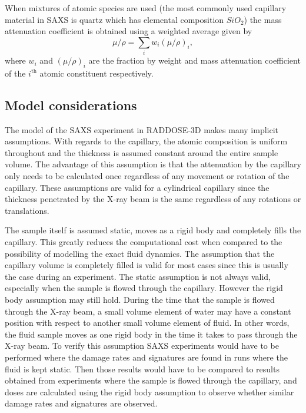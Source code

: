 When mixtures of atomic species are used (the most commonly used capillary material in SAXS is quartz which has elemental composition $SiO_2$) the mass attenuation coefficient is obtained using a weighted average given by
\begin{equation}
    \mu/\rho = \sum_i w_i (\mu/\rho)_i,
\end{equation}
where $w_i$ and $(\mu/\rho)_i$ are the fraction by weight and mass attenuation coefficient of the $i^{\text{th}}$ atomic constituent respectively.

\subsection{Model considerations}
\label{sub:Model considerations}
The model of the SAXS experiment in RADDOSE-3D makes many implicit assumptions.
With regards to the capillary, the atomic composition is uniform throughout and the thickness is assumed constant around the entire sample volume.
The advantage of this assumption is that the attenuation by the capillary only needs to be calculated once regardless of any movement or rotation of the capillary.
These assumptions are valid for a cylindrical capillary since the thickness penetrated by the X-ray beam is the same regardless of any rotations or translations.

The sample itself is assumed static, moves as a rigid body and completely fills the capillary.
This greatly reduces the computational cost when compared to the possibility of modelling the exact fluid dynamics.
The assumption that the capillary volume is completely filled is valid for most cases since this is usually the case during an experiment.
The static assumption is not always valid, especially when the sample is flowed through the capillary.
However the rigid body assumption may still hold.
During the time that the sample is flowed through the X-ray beam, a small volume element of water may have a constant position with respect to another small volume element of fluid.
In other words, the fluid sample moves as one rigid body in the time it takes to pass through the X-ray beam.
To verify this assumption SAXS experiments would have to be performed where the damage rates and signatures are found in runs where the fluid is kept static.
Then those results would have to be compared to results obtained from experiments where the sample is flowed through the capillary, and doses are calculated using the rigid body assumption to observe whether similar damage rates and signatures are observed.


